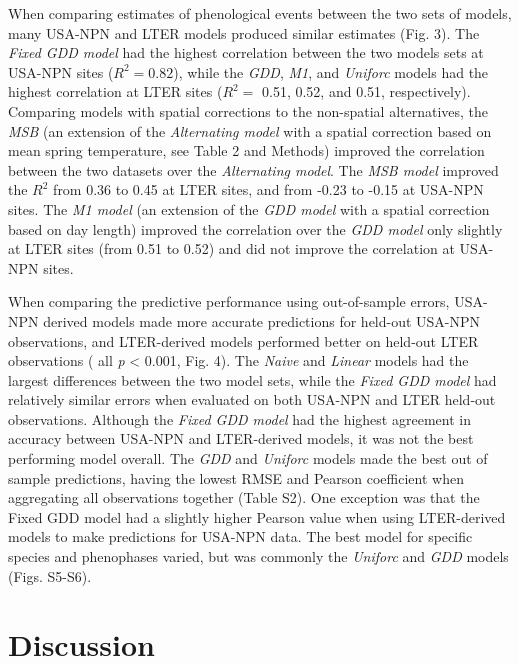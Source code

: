 \documentclass[fleqn,12pt,lineno]{article}
\begin{document}
When comparing estimates of phenological events between the two sets of models, many USA-NPN and LTER models produced similar estimates (Fig. 3). The \textit{Fixed GDD model} had the highest correlation between the two models sets at USA-NPN sites ($R^2 = 0.82$), while the \textit{GDD}, \textit{M1}, and \textit{Uniforc} models had the highest correlation at LTER sites ($R^2 =$ 0.51, 0.52, and 0.51, respectively). Comparing models with spatial corrections to the non-spatial alternatives, the \textit{MSB} (an extension of the \textit{Alternating model} with a spatial correction based on mean spring temperature, see Table 2 and Methods) improved the correlation between the two datasets over the \textit{Alternating model}. The \textit{MSB model} improved the $R^2$ from 0.36 to 0.45 at LTER sites, and from -0.23 to -0.15 at USA-NPN sites. The \textit{M1 model} (an extension of the \textit{GDD model} with a spatial correction based on day length) improved the correlation over the \textit{GDD model} only slightly at LTER sites (from 0.51 to 0.52) and did not improve the correlation at USA-NPN sites. 

When comparing the predictive performance using out-of-sample errors, USA-NPN derived models made more accurate predictions for held-out USA-NPN observations, and LTER-derived models performed better on held-out LTER observations ( all \textit{p} < 0.001, Fig. 4). The \textit{Naive} and \textit{Linear} models had the largest differences between the two model sets, while the \textit{Fixed GDD model} had relatively similar errors when evaluated on both USA-NPN and LTER held-out observations. Although the \textit{Fixed GDD model} had the highest agreement in accuracy between USA-NPN and LTER-derived models, it was not the best performing model overall. The \textit{GDD} and \textit{Uniforc} models made the best out of sample predictions, having the lowest RMSE and Pearson coefficient when aggregating all observations together (Table S2). One exception was that the Fixed GDD model had a slightly higher Pearson value when using LTER-derived models to make predictions for USA-NPN data. The best model for specific species and phenophases varied, but was commonly the \textit{Uniforc} and \textit{GDD} models (Figs. S5-S6).

\section*{Discussion}
\end{document}
